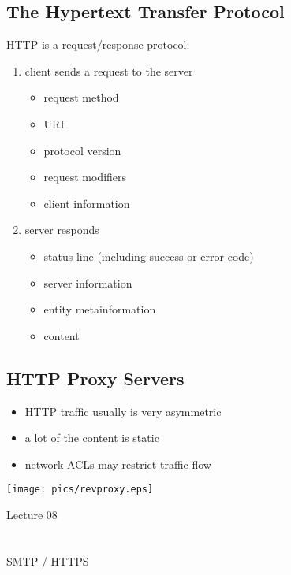 \documentclass[xga]{xdvislides}
\begin{document}
\subsection{The Hypertext Transfer Protocol}
HTTP is a request/response protocol:
\begin{enumerate}
	\item client sends a request to the server
		\begin{itemize}
			\item request method
			\item URI
			\item protocol version
			\item request modifiers
			\item client information
		\end{itemize}
	\item server responds
		\begin{itemize}
			\item status line (including success or error code)
			\item server information
			\item entity metainformation
			\item content
		\end{itemize}
\end{enumerate}

\subsection{HTTP Proxy Servers}
\begin{itemize}
	\item HTTP traffic usually is very asymmetric
	\item a lot of the content is static
	\item network ACLs may restrict traffic flow
\end{itemize}
\vspace{.25in}
\begin{center}
	\texttt{[image: pics/revproxy.eps]}
\end{center}

\newpage
\vspace*{\fill}
\begin{center}
    \Hugesize
        Lecture 08 \\ [1em]
    \hspace*{5mm}
    \blueline\\
    \hspace*{5mm}\\
	SMTP / HTTPS
\end{center}
\vspace*{\fill}
\end{document}
